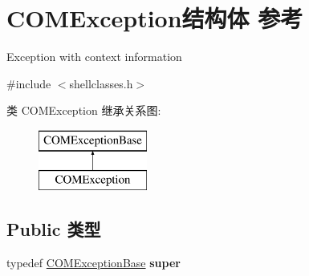 \hypertarget{struct_c_o_m_exception}{}\section{C\+O\+M\+Exception结构体 参考}
\label{struct_c_o_m_exception}


Exception with context information  




{\ttfamily \#include $<$shellclasses.\+h$>$}

类 C\+O\+M\+Exception 继承关系图\+:\begin{figure}[H]
\begin{center}
\leavevmode
\includegraphics[height=2.000000cm]{struct_c_o_m_exception}
\end{center}
\end{figure}
\subsection*{Public 类型}
\begin{DoxyCompactItemize}
\item 
\mbox{\label{struct_c_o_m_exception_a704e877296a3b04f0cf35f356d4bffec}} 
typedef \hyperlink{struct_c_o_m_exception_base}{C\+O\+M\+Exception\+Base} {\bfseries super}
\end{DoxyCompactItemize}
